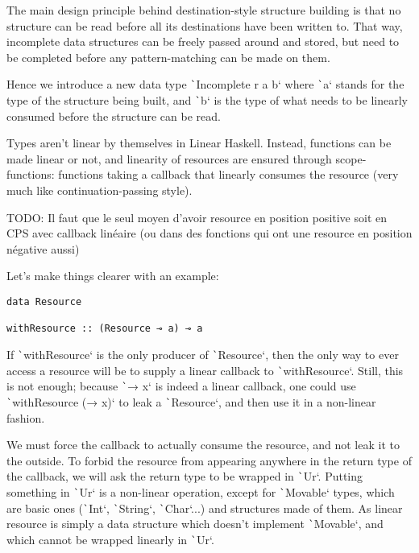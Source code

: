 \documentclass[english]{jflart}
\begin{document}
The main design principle behind destination-style structure building is that no structure can be read before all its destinations have been written to. That way, incomplete data structures can be freely passed around and stored, but need to be completed before any pattern-matching can be made on them.

Hence we introduce a new data type \texttt`Incomplete r a b` where \texttt`a` stands for the type of the structure being built, and \texttt`b` is the type of what needs to be linearly consumed before the structure can be read.

Types aren't linear by themselves in Linear Haskell. Instead, functions can be made linear or not, and linearity of resources are ensured through scope-functions: functions taking a callback that linearly consumes the resource (very much like continuation-passing style).

TODO: Il faut que le seul moyen d'avoir resource en position positive soit en CPS avec callback linéaire (ou dans des fonctions qui ont une resource en position négative aussi)

Let's make things clearer with an example:
\begin{verbatim}
data Resource

withResource :: (Resource ⊸ a) ⊸ a
\end{verbatim}

If \texttt`withResource` is the only producer of \texttt`Resource`, then the only way to ever access a resource will be to supply a linear callback to \texttt`withResource`. Still, this is not enough; because \texttt`\x → x` is indeed a linear callback, one could use \texttt`withResource (\x → x)` to leak a \texttt`Resource`, and then use it in a non-linear fashion.

We must force the callback to actually consume the resource, and not leak it to the outside. To forbid the resource from appearing anywhere in the return type of the callback, we will ask the return type to be wrapped in \texttt`Ur`. Putting something in \texttt`Ur` is a non-linear operation, except for \texttt`Movable` types, which are basic ones (\texttt`Int`, \texttt`String`, \texttt`Char`...) and structures made of them. As linear resource is simply a data structure which doesn't implement \texttt`Movable`, and which cannot be wrapped linearly in \texttt`Ur`.
\end{document}
